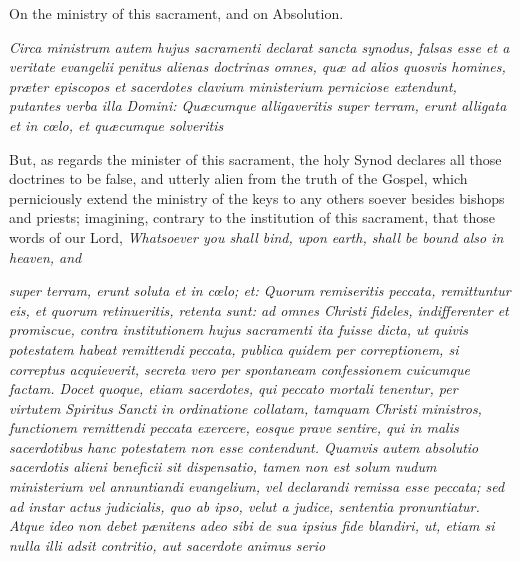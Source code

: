 On the ministry of this sacrament, and on Absolution.

\emph{Circa ministrum autem hujus sacramenti declarat sancta synodus, falsas esse et a veritate evangelii penitus alienas doctrinas omnes, quæ ad alios quosvis homines, præter episcopos et sacerdotes clavium ministerium perniciose extendunt, putantes verba illa Domini: Quæcumque alligaveritis super terram, erunt alligata et in cœlo, et quæcumque solveritis }

But, as regards the minister of this sacrament, the holy Synod declares all those doctrines to be false, and utterly alien from the truth of the Gospel, which perniciously extend the ministry of the keys to any others soever besides bishops and priests; imagining, contrary to the institution of this sacrament, that those words of our Lord, \emph{Whatsoever you shall bind, upon earth, shall be bound also in heaven, and}

\emph{super terram, erunt soluta et in cœlo; et: Quorum remiseritis peccata, remittuntur eis, et quorum retinueritis, retenta sunt: ad omnes Christi fideles, indifferenter et promiscue, contra institutionem hujus sacramenti ita fuisse dicta, ut quivis potestatem habeat remittendi peccata, publica quidem per correptionem, si correptus acquieverit, secreta vero per spontaneam confessionem cuicumque factam. Docet quoque, etiam sacerdotes, qui peccato mortali tenentur, per virtutem Spiritus Sancti in ordinatione collatam, tamquam Christi ministros, functionem remittendi peccata exercere, eosque prave sentire, qui in malis sacerdotibus hanc potestatem non esse contendunt. Quamvis autem absolutio sacerdotis alieni beneficii sit dispensatio, tamen non est solum nudum ministerium vel annuntiandi evangelium, vel declarandi remissa esse peccata; sed ad instar actus judicialis, quo ab ipso, velut a judice, sententia pronuntiatur. Atque ideo non debet pænitens adeo sibi de sua ipsius fide blandiri, ut, etiam si nulla illi adsit contritio, aut sacerdote animus serio }

